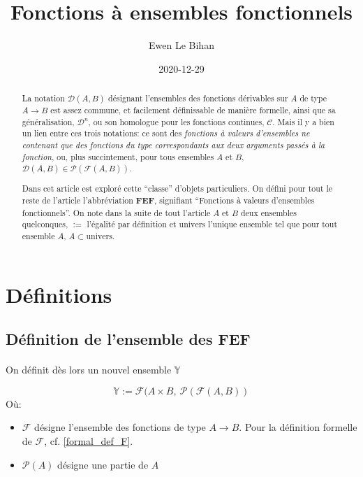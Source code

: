 \documentclass{article}
\author{Ewen Le Bihan}
\date{2020-12-29}
\title{Fonctions à ensembles fonctionnels}
\newcommand{\Y}{{\mathbb Y}}
\newcommand{\cC}{{\mathcal C}}
\newcommand{\cD}{{\mathcal D}}
\newcommand{\cF}{{\mathcal F}}
\begin{document}
\maketitle
\begin{abstract}
	La notation $\cD(A, B)$ désignant l'ensembles des fonctions dérivables sur $A$ de type $A\to B$ est assez commune, et facilement définissable de manière formelle, ainsi que sa généralisation, $\cD^n$, ou son homologue pour les fonctions continues, $\cC$. Mais il y a bien un lien entre ces trois notations: ce sont des \emph{fonctions à valeurs d'ensembles ne contenant que des fonctions du type correspondants aux deux arguments passés à la fonction}, ou, plus succintement, pour tous ensembles $A$ et $B$, $\cD(A, B) \in \mathcal P(\cF(A, B))$.
	

	Dans cet article est exploré cette “classe” d'objets particuliers. On défini pour tout le reste de l'article l'abbréviation {\bf FEF}, signifiant “Fonctions à valeurs d'ensembles fonctionnels”. On note dans la suite de tout l'article $A$ et $B$ deux ensembles quelconques, $:=$ l'égalité par définition et $\text{univers}$ l'unique ensemble tel que pour tout ensemble $A$, $A \subset \text{univers}$.
\end{abstract}

\section{Définitions}

\subsection{Définition de l'ensemble des FEF}
\paragraph{}

On définit dès lors un nouvel ensemble $\Y$%

\[
	\Y := \cF(A \times B,\ \mathcal P(\cF(A, B))
\] 
Où:

\begin{itemize}
	\item $\cF$ désigne l'ensemble des fonctions de type $A\to B$. Pour la définition formelle de $\cF$, cf. \ref{formal_def_F}.
	\item $\mathcal P(A)$ désigne une partie de $A$
\end{itemize}
\end{document}
